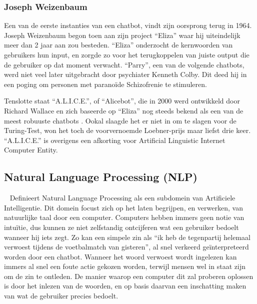 \subsubsection{Joseph Weizenbaum}
Een van de eerste instanties van een chatbot, vindt zijn oorsprong terug in 1964. Joseph Weizenbaum \autocite{Weizenbaum1966} begon toen aan zijn project “Eliza” waar hij uiteindelijk meer dan 2 jaar aan zou besteden. “Eliza” onderzocht de kernwoorden van gebruikers hun input, en zorgde zo voor het terugkoppelen van juiste output die de gebruiker op dat moment verwacht. 
“Parry”, een van de volgende chatbots, werd niet veel later uitgebracht door psychiater Kenneth Colby. Dit deed hij in een poging om personen met paranoïde Schizofrenie te stimuleren. 

Tenslotte staat “A.L.I.C.E.”, of “Alicebot”, die in 2000 werd ontwikkeld door Richard Wallace en zich baseerde op “Eliza” nog steeds bekend als een van de meest robuuste chatbots \textcite{Dale2016}. Ookal slaagde het er niet in om te slagen voor de Turing-Test, won het toch de voorvernoemde Loebner-prijs maar liefst drie keer. “A.L.I.C.E.” is overigens een afkorting voor Artificial Linguistic Internet Computer Entity. 

\subsection{Natural Language Processing (NLP)}
~\cite{Seif2018} Definieert Natural Language Processing als een subdomein van Artificiele Intelligentie. Dit domein focust zich op het laten begrijpen, en verwerken, van natuurlijke taal door een computer. Computers hebben immers geen notie van intuïtie, dus kunnen ze niet zelfstandig ontcijferen wat een gebruiker bedoelt wanneer hij iets zegt. Zo kan een simpele zin als “ik heb de tegenpartij helemaal verwoest tijdens de voetbalmatch van gisteren”, al snel verkeerd geïnterpreteerd worden door een chatbot. Wanneer het woord verwoest wordt ingelezen kan immers al snel een foute actie gekozen worden, terwijl mensen wel in staat zijn om de zin te ontleden. De manier waarop een computer dit zal proberen oplossen is door het inlezen van de woorden, en op basis daarvan een inschatting maken van wat de gebruiker precies bedoelt. 

